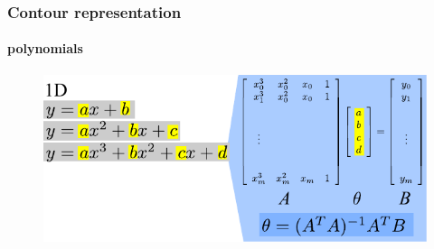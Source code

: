 \begin{frame}
\frametitle{Contour representation}
\framesubtitle{polynomials}
\logoCSIPCPL\mypagenum
	\begin{figure}
		\includegraphics[width=1.0\textwidth]{figs/theory_curves_PolynomialFitting.pdf}
	\end{figure}
\end{frame}







